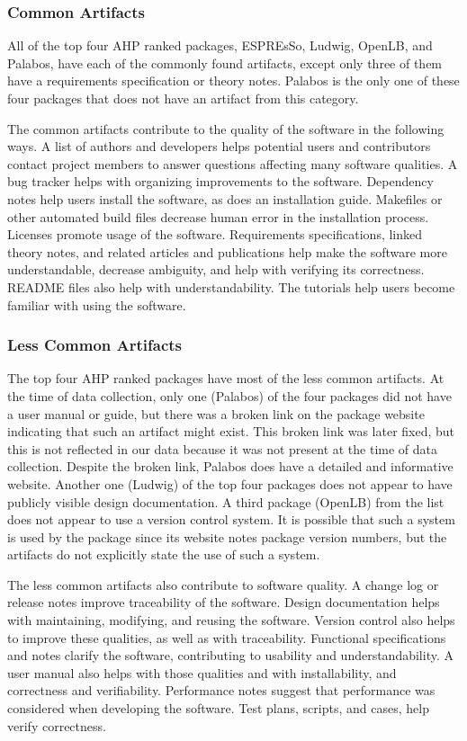\documentclass[final, 3p, times, authoryear]{elsarticle}
\begin{document}
\subsubsection{Common Artifacts}

All of the top four AHP ranked packages, ESPREsSo, Ludwig, OpenLB, and Palabos,
have each of the commonly found artifacts, except only three of them have a
requirements specification or theory notes. Palabos is the only one of these
four packages that does not have an artifact from this category.

The common artifacts contribute to the quality of the software in the following
ways. A list of authors and developers helps potential users and contributors
contact project members to answer questions affecting many software qualities. A
bug tracker helps with organizing improvements to the software. Dependency notes
help users install the software, as does an installation guide. Makefiles or
other automated build files decrease human error in the installation process.
Licenses promote usage of the software. Requirements specifications, linked
theory notes, and related articles and publications help make the software more
understandable, decrease ambiguity, and help with verifying its correctness.
README files also help with understandability. The tutorials help users become
familiar with using the software.


\subsubsection{Less Common Artifacts} \label{lesscommon}

The top four AHP ranked packages have most of the less common artifacts. At the
time of data collection, only one (Palabos) of the four packages did not have a
user manual or guide, but there was a broken link on the package website
indicating that such an artifact might exist. This broken link was later fixed,
but this is not reflected in our data because it was not present at the time of
data collection. Despite the broken link, Palabos does have a detailed and
informative website. Another one (Ludwig) of the top four packages does not
appear to have publicly visible design documentation. A third package (OpenLB)
from the list does not appear to use a version control system. It is possible
that such a system is used by the package since its website notes package
version numbers, but the artifacts do not explicitly state the use of such a
system.

The less common artifacts also contribute to software quality. A change log or
release notes improve traceability of the software. Design documentation helps
with maintaining, modifying, and reusing the software. Version control also
helps to improve these qualities, as well as with traceability. Functional
specifications and notes clarify the software, contributing to usability and
understandability. A user manual also helps with those qualities and with
installability, and correctness and verifiability. Performance notes suggest
that performance was considered when developing the software. Test plans,
scripts, and cases, help verify correctness. 
\end{document}
